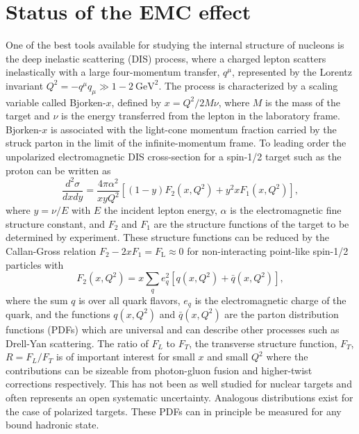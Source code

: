 \section{Status of the EMC effect\label{sec:status}}
%
One of the best tools available for studying the internal structure of nucleons is the deep inelastic
scattering (DIS) process, where a charged lepton scatters inelastically with a large four-momentum
transfer, $q^\mu$, represented by the Lorentz invariant $Q^2 = -q^\mu q_\mu \gg 1-2~\mathrm{GeV}^2$.
The process is characterized by a scaling variable called Bjorken-$x$, defined by $x = Q^2/2M \nu$, 
where $M$ is the mass of the target and $\nu$ is the energy transferred from the lepton in the laboratory frame. Bjorken-$x$ is associated with the light-cone momentum fraction carried by the struck parton in the limit of the infinite-momentum frame. To leading order the unpolarized electromagnetic DIS cross-section for a spin-1/2 target such as the proton can be written as~\cite{PhysRevD.98.030001}
%
\begin{equation}
\frac{d^2 \sigma}{dx dy} = \frac{4 \pi \alpha^2}{x y Q^2} \left[ (1-y)F_2(x, Q^2) + y^2 x F_1(x, Q^2) \right],
\end{equation}
%
where $y = \nu/E$ with $E$ the incident lepton energy, $\alpha$ is the electromagnetic fine structure constant, and $F_2$
and $F_1$ are the structure functions of the target to be determined by experiment. These structure functions can be reduced by the Callan-Gross relation $F_2 - 2xF_1 = F_\mathrm{L} \approx 0$ for non-interacting point-like spin-1/2 particles with
%
\begin{equation}
F_2(x,Q^2) = x \sum_{q} e_q^2 \left[q(x,Q^2) + \bar{q}(x,Q^2)\right],
\end{equation}
%
where the sum $q$ is over all quark flavors,  $e_q$ is the electromagnetic charge of the quark, and the functions $q(x,Q^2)$ and $\bar{q}(x,Q^2)$ are the parton distribution functions (PDFs) which are universal and can describe other processes such as Drell-Yan scattering.  The ratio of $F_L$ to $F_T$, the transverse structure function, $F_T$,  $R = F_L/F_T$ is of important interest for small $x$ and small $Q^2$ where the contributions can be sizeable from photon-gluon fusion and higher-twist corrections respectively.  This has not been as well studied for nuclear targets and often represents an open systematic uncertainty.  Analogous distributions exist for the case of polarized targets. These PDFs can in principle be measured for any bound hadronic state.

